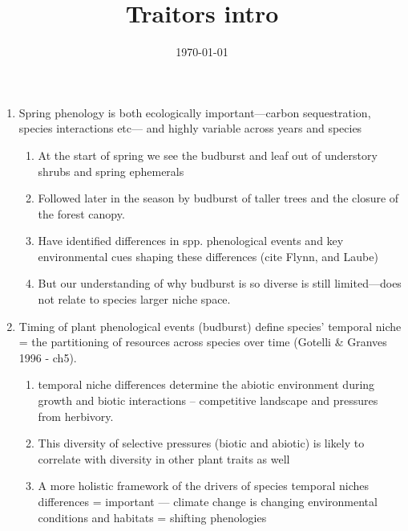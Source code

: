 \documentclass{article}
\begin{document}
\title{Traitors intro}
\date{\today}

\maketitle 

\begin{enumerate}

\item Spring phenology is both ecologically important---carbon sequestration, species interactions etc--- and highly variable across years and species
\begin{enumerate}
\item At the start of spring we see the budburst and leaf out of understory shrubs and spring ephemerals
\item Followed later in the season by budburst of taller trees and the closure of the forest canopy.
\item Have identified differences in spp. phenological events and key environmental cues shaping these differences (cite Flynn, and Laube)
\item But our understanding of why budburst is so diverse is still limited---does not relate to species larger niche space.
\end{enumerate} 

\item Timing of plant phenological events (budburst) define species' temporal niche = the partitioning of resources across species over time (Gotelli \& Granves 1996 - ch5).
\begin{enumerate}
\item temporal niche differences determine the abiotic environment during growth and biotic interactions -- competitive landscape and pressures from herbivory.
\item This diversity of selective pressures (biotic and abiotic) is likely to correlate with diversity in other plant traits as well
\item A more holistic framework of the drivers of species temporal niches differences = important --- climate change is changing environmental conditions and habitats = shifting phenologies
\end{enumerate}


\end{enumerate}
\end{document}
